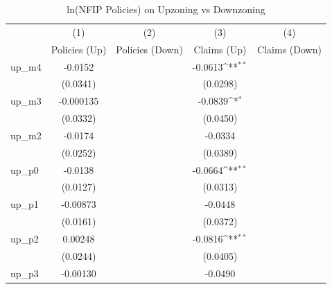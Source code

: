 \begin{table}[htbp]\centering
\def\sym#1{\ifmmode^{#1}\else\(^{#1}\)\fi}
\caption{ln(NFIP Policies) on Upzoning vs Downzoning}
\begin{tabular}{l*{4}{c}}
\hline\hline
                    &\multicolumn{1}{c}{(1)}&\multicolumn{1}{c}{(2)}&\multicolumn{1}{c}{(3)}&\multicolumn{1}{c}{(4)}\\
                    &\multicolumn{1}{c}{Policies (Up)}&\multicolumn{1}{c}{Policies (Down)}&\multicolumn{1}{c}{Claims (Up)}&\multicolumn{1}{c}{Claims (Down)}\\
\hline
up\_m4               &     -0.0152         &                     &     -0.0613\sym{**} &                     \\
                    &    (0.0341)         &                     &    (0.0298)         &                     \\
[1em]
up\_m3               &   -0.000135         &                     &     -0.0839\sym{*}  &                     \\
                    &    (0.0332)         &                     &    (0.0450)         &                     \\
[1em]
up\_m2               &     -0.0174         &                     &     -0.0334         &                     \\
                    &    (0.0252)         &                     &    (0.0389)         &                     \\
[1em]
up\_p0               &     -0.0138         &                     &     -0.0664\sym{**} &                     \\
                    &    (0.0127)         &                     &    (0.0313)         &                     \\
[1em]
up\_p1               &    -0.00873         &                     &     -0.0448         &                     \\
                    &    (0.0161)         &                     &    (0.0372)         &                     \\
[1em]
up\_p2               &     0.00248         &                     &     -0.0816\sym{**} &                     \\
                    &    (0.0244)         &                     &    (0.0405)         &                     \\
[1em]
up\_p3               &    -0.00130         &                     &     -0.0490         &                     \\

\end{tabular}
\end{table}
